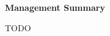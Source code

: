 \thispagestyle{plain}
\begin{center}
    \Large
    \textbf{}
    
    \vspace{0.4cm}
    \large
    

    \vspace{0.4cm}
    \textbf{}

    \vspace{0.9cm}
    \textbf{Management Summary}

\end{center}
    TODO